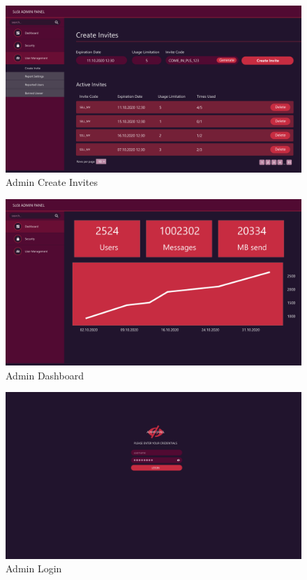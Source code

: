 \begin{figure}[h]
    \centering
    \includegraphics[width=1.0\textwidth]{./graphics/wireframes/AdminCreateInvites}
    \caption{Admin Create Invites}
    \label{fig:figure8}
\end{figure}

\begin{figure}[h]
    \centering
    \includegraphics[width=1.0\textwidth]{./graphics/wireframes/AdminDashboard}
    \caption{Admin Dashboard}
    \label{fig:figure9}
\end{figure}

\begin{figure}[h]
    \centering
    \includegraphics[width=1.0\textwidth]{./graphics/wireframes/AdminLogin}
    \caption{Admin Login}
    \label{fig:figure10}
\end{figure}

